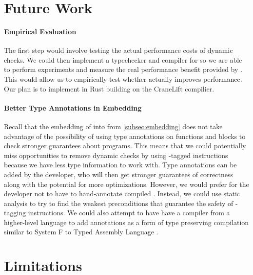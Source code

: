 \section{Future Work}
\paragraph{Empirical Evaluation}
The first step would involve testing the actual performance costs of dynamic checks.
We could then implement a typechecker and compiler for \name so we are able to perform experiments and measure the real performance benefit provided by \name.
This would allow us to empirically test whether \name actually improves performance.
Our plan is to implement \name in Rust building on the CraneLift compilier.

\paragraph{Better Type Annotations in Embedding}
Recall that the embedding of \wasm into \name from \autoref{subsec:embedding} does not take advantage of the possibility of using type annotations on functions and blocks to check stronger guarantees about programs.
This means that we could potentially miss opportunities to remove dynamic checks by using \prechk-tagged instructions because we have less type information to work with.
Type annotations can be added by the developer, who will then get stronger guarantees of correctness along with the potential for more optimizations.
However, we would prefer for the developer not to have to hand-annotate compiled \wasm.
Instead, we could use static analysis to try to find the weakest preconditions that guarantee the safety of \prechk-tagging instructions.
We could also attempt to have have a compiler from a higher-level language to \wasm add annotations as a form of type preserving compilation similar to System F to Typed Assembly Language \cite{FtoTAL}.

\section{Limitations}
